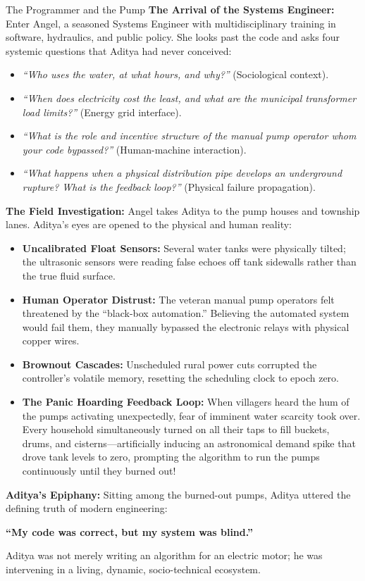 \begin{storybox}{The Programmer and the Pump}
\textbf{The Arrival of the Systems Engineer:}
Enter Angel, a seasoned Systems Engineer with multidisciplinary training in software, hydraulics, and public policy. She looks past the code and asks four systemic questions that Aditya had never conceived:
\begin{itemize}[leftmargin=1.5em]
    \item \textit{``Who uses the water, at what hours, and why?''} (Sociological context).
    \item \textit{``When does electricity cost the least, and what are the municipal transformer load limits?''} (Energy grid interface).
    \item \textit{``What is the role and incentive structure of the manual pump operator whom your code bypassed?''} (Human-machine interaction).
    \item \textit{``What happens when a physical distribution pipe develops an underground rupture? What is the feedback loop?''} (Physical failure propagation).
\end{itemize}

\textbf{The Field Investigation:}
Angel takes Aditya to the pump houses and township lanes. Aditya's eyes are opened to the physical and human reality:
\begin{itemize}[leftmargin=1.5em]
    \item \textbf{Uncalibrated Float Sensors:} Several water tanks were physically tilted; the ultrasonic sensors were reading false echoes off tank sidewalls rather than the true fluid surface.
    \item \textbf{Human Operator Distrust:} The veteran manual pump operators felt threatened by the ``black-box automation.'' Believing the automated system would fail them, they manually bypassed the electronic relays with physical copper wires.
    \item \textbf{Brownout Cascades:} Unscheduled rural power cuts corrupted the controller's volatile memory, resetting the scheduling clock to epoch zero.
    \item \textbf{The Panic Hoarding Feedback Loop:} When villagers heard the hum of the pumps activating unexpectedly, fear of imminent water scarcity took over. Every household simultaneously turned on all their taps to fill buckets, drums, and cisterns—artificially inducing an astronomical demand spike that drove tank levels to zero, prompting the algorithm to run the pumps continuously until they burned out!
\end{itemize}

\textbf{Aditya's Epiphany:}
Sitting among the burned-out pumps, Aditya uttered the defining truth of modern engineering:
\begin{center}
\textbf{\large ``My code was correct, but my system was blind.''}
\end{center}
Aditya was not merely writing an algorithm for an electric motor; he was intervening in a living, dynamic, socio-technical ecosystem.
\end{storybox}

